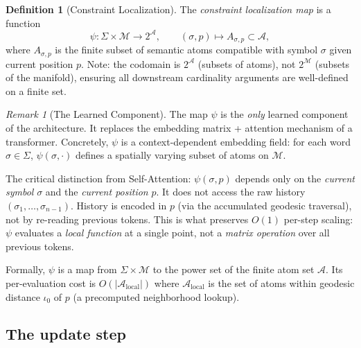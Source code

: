 \documentclass[11pt,a4paper]{article}
\theoremstyle{definition}
\newtheorem{definition}[theorem]{Definition}
\theoremstyle{remark}
\newtheorem{remark}[theorem]{Remark}
\begin{document}
\begin{definition}[Constraint Localization]\label{def:constraint}
The \emph{constraint localization map} is a function
\begin{equation}\label{eq:psi}
    \psi : \Sigma \times \mathcal{M} \to 2^{\mathcal{A}},
    \qquad (\sigma, p) \mapsto A_{\sigma,p} \subset \mathcal{A},
\end{equation}
where $A_{\sigma,p}$ is the finite subset of semantic atoms 
compatible with symbol $\sigma$ given current position $p$. 
Note: the codomain is $2^{\mathcal{A}}$ (subsets of atoms), 
not $2^{\mathcal{M}}$ (subsets of the manifold), ensuring all 
downstream cardinality arguments are well-defined on a finite set.
\end{definition}

\begin{remark}[The Learned Component]\label{rem:learned}
The map $\psi$ is the \emph{only} learned component of the 
architecture. It replaces the embedding matrix + attention mechanism 
of a transformer. Concretely, $\psi$ is a context-dependent 
embedding field: for each word $\sigma \in \Sigma$, $\psi(\sigma, 
\cdot)$ defines a spatially varying subset of atoms on $\mathcal{M}$.

The critical distinction from Self-Attention: $\psi(\sigma, p)$ 
depends only on the \emph{current symbol} $\sigma$ and the 
\emph{current position} $p$. It does not access the raw history 
$(\sigma_1, \ldots, \sigma_{n-1})$. History is encoded in $p$ 
(via the accumulated geodesic traversal), not by re-reading 
previous tokens. This is what preserves $O(1)$ per-step scaling: 
$\psi$ evaluates a \emph{local function} at a single point, not a 
\emph{matrix operation} over all previous tokens.

Formally, $\psi$ is a map from $\Sigma \times \mathcal{M}$ to 
the power set of the finite atom set $\mathcal{A}$. Its per-evaluation 
cost is $O(|\mathcal{A}_{\mathrm{local}}|)$ where 
$\mathcal{A}_{\mathrm{local}}$ is the set of atoms within geodesic 
distance $\iota_0$ of $p$ (a precomputed neighborhood lookup).
\end{remark}

\subsection{The update step}\label{sec:update_step}

\end{document}
